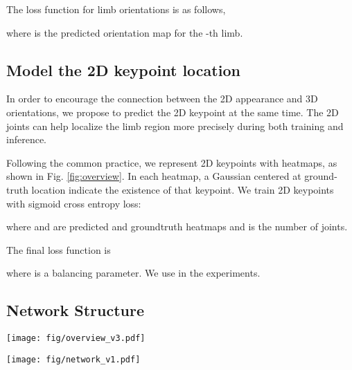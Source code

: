 \documentclass{bmvc2k}
\begin{document}
The loss function for limb orientations is as follows,

where  is the predicted orientation map for the -th limb. 





\subsection{Model the 2D keypoint location}
In order to encourage the connection between the 2D appearance and 3D orientations, we propose to predict the 2D keypoint at the same time. The 2D joints can help localize the limb region more precisely during both training and inference. 

Following the common practice, we represent 2D keypoints with heatmaps, as shown in Fig. \ref{fig:overview}. In each heatmap, a Gaussian centered at ground-truth location indicate the existence of that keypoint. 
We train 2D keypoints with sigmoid cross entropy loss:

where  and  are predicted and groundtruth heatmaps and  is the number of joints.

The final loss function is 

where  is a balancing parameter. We use  in the experiments. 

\subsection{Network Structure}
\begin{figure*}[t]
	\begin{center}
		\texttt{[image: fig/overview\_v3.pdf]}
	\end{center}
	\caption{Overview of our framework. We use both 2D heatmaps (d) and limb orientations (e) as the supervisions. The 3D orientation maps are derived from keypoints without extra annotations.
		In the test stage, the predicted keypoint locations are used to crop the limb regions on the orientation heatmap to get the orientation prediction.}
\label{fig:overview}
\end{figure*}
\begin{figure*}[t!]
	\begin{center}
\texttt{[image: fig/network\_v1.pdf]}
	\end{center}
	\caption{Network structure. 
		 is the output of the hourglass module,
		 is the 2D heatmaps
		and  is orientation maps.  is the image feature and 
		,  and  are the intermediate features,
}
	
	\label{fig: network structure}
\end{figure*}
\end{document}
